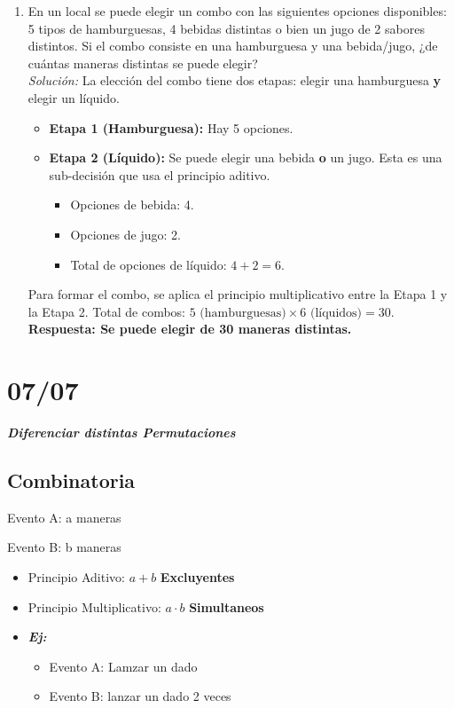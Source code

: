\documentclass[12pt, letterpaper]{article}
\begin{document}
\begin{enumerate}
    \item En un local se puede elegir un combo con las siguientes opciones disponibles: 5 tipos de hamburguesas, 4 bebidas distintas o bien un jugo de 2 sabores distintos. Si el combo consiste en una hamburguesa y una bebida/jugo, ¿de cuántas maneras distintas se puede elegir? \\
    \textit{Solución:}
    La elección del combo tiene dos etapas: elegir una hamburguesa \textbf{y} elegir un líquido.
    \begin{itemize}
        \item \textbf{Etapa 1 (Hamburguesa):} Hay 5 opciones.
        \item \textbf{Etapa 2 (Líquido):} Se puede elegir una bebida \textbf{o} un jugo. Esta es una sub-decisión que usa el principio aditivo.
        \begin{itemize}
            \item Opciones de bebida: 4.
            \item Opciones de jugo: 2.
            \item Total de opciones de líquido: $4 + 2 = 6$.
        \end{itemize}
    \end{itemize}
    Para formar el combo, se aplica el principio multiplicativo entre la Etapa 1 y la Etapa 2.
    Total de combos: $5 \text{ (hamburguesas)} \times 6 \text{ (líquidos)} = 30$. \\
    \textbf{Respuesta: Se puede elegir de 30 maneras distintas.}
\end{enumerate}
\newpage


\section{07/07}
\textbf{\textit{\large{Diferenciar distintas Permutaciones}}}

\subsection{Combinatoria}
Evento A: a maneras 

Evento B: b maneras

\begin{itemize}
    \item Principio Aditivo: $a + b$ \textbf{Excluyentes}
    \item Principio Multiplicativo: $a \cdot b$ \textbf{Simultaneos} 
    \item \textbf{\textit{Ej:}}
    \begin{itemize}
        \item Evento A: Lamzar un dado
        \item Evento B: lanzar un dado 2 veces
    \end{itemize}
\end{itemize}
\end{document}
